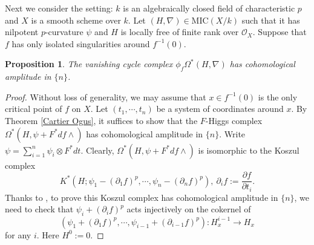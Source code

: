 \documentclass[12pt, a4paper]{article}
\newtheorem{proposition}{Proposition}[section]
\begin{document}
Next we consider the setting: $k$ is an algebraically closed field of characteristic  $p$ and $X$ is a smooth scheme over $k$. Let $(H,\nabla)\in\mathrm{MIC}(X/k)$ such that it has nilpotent $p$-curvature $\psi$ and $H$ is locally free of finite rank over $\mathcal O_X$. Suppose that $f$ has only isolated singularities around $f^{-1}(0)$.
\begin{proposition}\label{amplitude n}
The vanishing cycle complex $\phi_f\Omega^*(H,\nabla)$ has cohomological amplitude in $\{n\}$.
\end{proposition}
\begin{proof}
Without loss of generality, we may assume that $x\in f^{-1}(0)$ is the only critical point of $f$ on $X$. Let $(t_1,\cdots,t_n)$ be a system of coordinates around $x$. By Theorem \ref{Cartier Ogus}, it suffices to show that the $F$-Higgs complex $\Omega^*(H,\psi+F^*df\wedge)$ has cohomological amplitude in $\{n\}$. Write $\psi=\sum_{i=1}^n\psi_i\otimes F^*dt$. Clearly, $\Omega^*(H,\psi+F^*df\wedge)$ is isomorphic to the Koszul complex 
$$K^*(H;\psi_1-(\partial_1f)^p,\cdots,\psi_n-(\partial_nf)^p),~\partial_if:=\frac{\partial f}{\partial t_i}.$$
Thanks to \cite[Corollary 2.2.3]{Ogus04}, to prove this Koszul complex has cohomological amplitude in $\{n\}$, we need to check that $\psi_i+(\partial_i f)^p$ acts injectively on the cokernel of
$$
(\psi_1+(\partial_1 f)^p,\cdots,\psi_{i-1}+(\partial_{i-1} f)^p):H_x^{i-1}\to H_x
$$
for any $i$. Here $H^0:=0$.


\end{proof}
\end{document}
